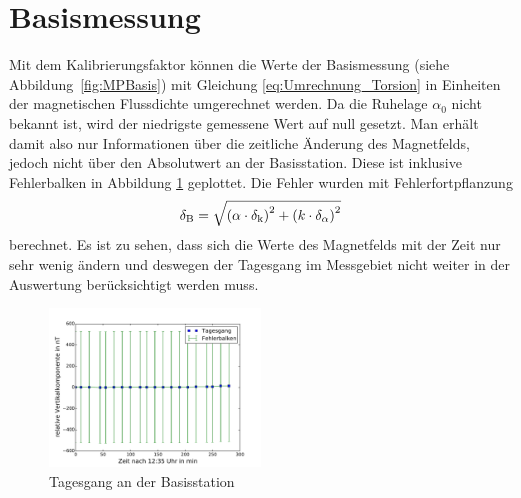 % 


\section{Basismessung}
\label{sec:basismessung}

Mit dem Kalibrierungsfaktor können die Werte der Basismessung (siehe Abbildung~\ref{fig:MPBasis}) mit Gleichung \eqref{eq:Umrechnung_Torsion} in Einheiten der magnetischen Flussdichte umgerechnet werden. Da die Ruhelage $\alpha_0$ nicht bekannt ist, wird der niedrigste gemessene Wert auf null gesetzt. Man erhält damit also nur Informationen über die zeitliche Änderung des Magnetfelds, jedoch nicht über den Absolutwert an der Basisstation. Diese ist inklusive Fehlerbalken in Abbildung \ref{fig:tagesgang} geplottet. Die Fehler wurden mit Fehlerfortpflanzung
\begin{equation}
 \delta_{\mathrm{B}}=\sqrt{\left(\alpha\cdot\delta_{\mathrm{k}}\right)^2+\left(k\cdot\delta_{\mathrm{\alpha}}\right)^2}
\end{equation}
berechnet. Es ist zu sehen, dass sich die Werte des Magnetfelds mit der Zeit nur sehr wenig ändern und deswegen der Tagesgang im Messgebiet nicht weiter in der Auswertung berücksichtigt werden muss.

\begin{figure}
 \centering
 \includegraphics[width=0.5\textwidth]{fig/tagesgang}
 \caption{Tagesgang an der Basisstation}
 \label{fig:tagesgang}
\end{figure}

